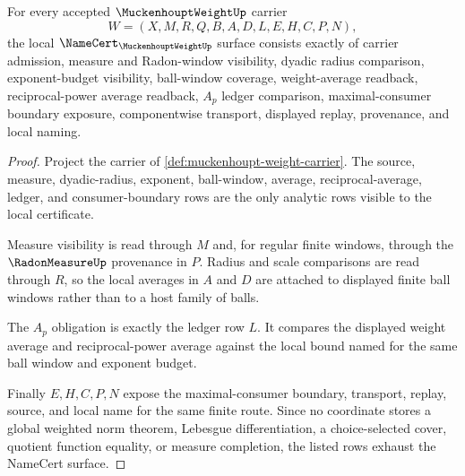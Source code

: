 \begin{theorem}
\label{thm:muckenhoupt-weight-namecert-obligations}
For every accepted $\MuckenhouptWeightUp$ carrier
$$
W=(X,M,R,Q,B,A,D,L,E,H,C,P,N),
$$
the local $\NameCert_{\MuckenhouptWeightUp}$ surface consists exactly of carrier admission, measure and Radon-window visibility, dyadic radius comparison, exponent-budget visibility, ball-window coverage, weight-average readback, reciprocal-power average readback, $A_p$ ledger comparison, maximal-consumer boundary exposure, componentwise transport, displayed replay, provenance, and local naming.
\end{theorem}
\begin{proof}
Project the carrier of \autoref{def:muckenhoupt-weight-carrier}. The source, measure, dyadic-radius, exponent, ball-window, average, reciprocal-average, ledger, and consumer-boundary rows are the only analytic rows visible to the local certificate.

Measure visibility is read through $M$ and, for regular finite windows, through the $\RadonMeasureUp$ provenance in $P$. Radius and scale comparisons are read through $R$, so the local averages in $A$ and $D$ are attached to displayed finite ball windows rather than to a host family of balls.

The $A_p$ obligation is exactly the ledger row $L$. It compares the displayed weight average and reciprocal-power average against the local bound named for the same ball window and exponent budget.

Finally $E,H,C,P,N$ expose the maximal-consumer boundary, transport, replay, source, and local name for the same finite route. Since no coordinate stores a global weighted norm theorem, Lebesgue differentiation, a choice-selected cover, quotient function equality, or measure completion, the listed rows exhaust the NameCert surface.
\end{proof}

